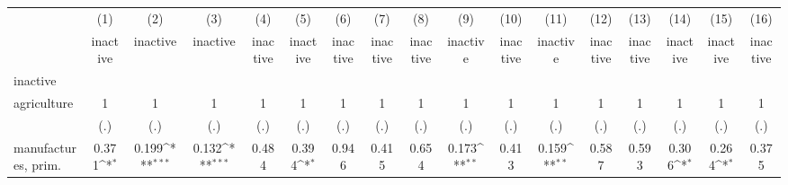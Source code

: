 {
\def\sym#1{\ifmmode^{#1}\else\(^{#1}\)\fi}
\begin{tabular}{l*{16}{c}}
\hline\hline
                    &\multicolumn{1}{c}{(1)}&\multicolumn{1}{c}{(2)}&\multicolumn{1}{c}{(3)}&\multicolumn{1}{c}{(4)}&\multicolumn{1}{c}{(5)}&\multicolumn{1}{c}{(6)}&\multicolumn{1}{c}{(7)}&\multicolumn{1}{c}{(8)}&\multicolumn{1}{c}{(9)}&\multicolumn{1}{c}{(10)}&\multicolumn{1}{c}{(11)}&\multicolumn{1}{c}{(12)}&\multicolumn{1}{c}{(13)}&\multicolumn{1}{c}{(14)}&\multicolumn{1}{c}{(15)}&\multicolumn{1}{c}{(16)}\\
                    &\multicolumn{1}{c}{inactive}&\multicolumn{1}{c}{inactive}&\multicolumn{1}{c}{inactive}&\multicolumn{1}{c}{inactive}&\multicolumn{1}{c}{inactive}&\multicolumn{1}{c}{inactive}&\multicolumn{1}{c}{inactive}&\multicolumn{1}{c}{inactive}&\multicolumn{1}{c}{inactive}&\multicolumn{1}{c}{inactive}&\multicolumn{1}{c}{inactive}&\multicolumn{1}{c}{inactive}&\multicolumn{1}{c}{inactive}&\multicolumn{1}{c}{inactive}&\multicolumn{1}{c}{inactive}&\multicolumn{1}{c}{inactive}\\
\hline
inactive            &                     &                     &                     &                     &                     &                     &                     &                     &                     &                     &                     &                     &                     &                     &                     &                     \\
agriculture         &           1         &           1         &           1         &           1         &           1         &           1         &           1         &           1         &           1         &           1         &           1         &           1         &           1         &           1         &           1         &           1         \\
                    &         (.)         &         (.)         &         (.)         &         (.)         &         (.)         &         (.)         &         (.)         &         (.)         &         (.)         &         (.)         &         (.)         &         (.)         &         (.)         &         (.)         &         (.)         &         (.)         \\
[1em]
manufactures, prim. &       0.371\sym{*}  &       0.199\sym{***}&       0.132\sym{***}&       0.484         &       0.394\sym{*}  &       0.946         &       0.415         &       0.654         &       0.173\sym{**} &       0.413         &       0.159\sym{**} &       0.587         &       0.593         &       0.306\sym{*}  &       0.264\sym{*}  &       0.375         \\

\end{tabular}}
